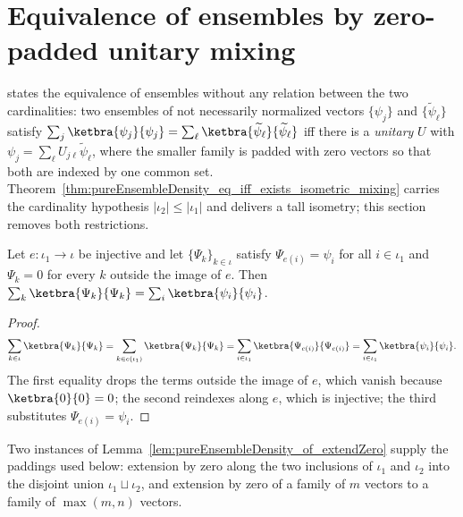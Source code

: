 \section{Equivalence of ensembles by zero-padded unitary mixing}
\label{sec:ensemble_equivalence_unitary}

\cite[Equivalence of ensembles, Equation~(2.10)]{Wolf2012Quantum} states the equivalence
of ensembles without any relation between the two cardinalities: two ensembles
of not necessarily normalized vectors $\{\psi_j\}$ and
$\{\widetilde\psi_\ell\}$ satisfy $\sum_j \ketbra{\psi_j}{\psi_j} = \sum_\ell
\ketbra{\widetilde\psi_\ell}{\widetilde\psi_\ell}$ iff there is a
\emph{unitary} $U$ with $\psi_j = \sum_\ell U_{j\ell}\widetilde\psi_\ell$,
where the smaller family is padded with zero vectors so that both are indexed
by one common set. Theorem~\ref{thm:pureEnsembleDensity_eq_iff_exists_isometric_mixing}
carries the cardinality hypothesis $|\iota_2| \le |\iota_1|$ and delivers a
tall isometry; this section removes both restrictions.

\begin{lemma}
    \label{lem:pureEnsembleDensity_of_extendZero}
    \leanok
    Let $e \colon \iota_1 \to \iota$ be injective and let
    $\{\Psi_k\}_{k \in \iota}$ satisfy $\Psi_{e(i)} = \psi_i$ for all
    $i \in \iota_1$ and $\Psi_k = 0$ for every $k$ outside the image of $e$.
    Then $\sum_{k} \ketbra{\Psi_k}{\Psi_k} = \sum_i \ketbra{\psi_i}{\psi_i}$.
\end{lemma}

\begin{proof}
    \leanok
    \begin{align}
        \sum_{k \in \iota} \ketbra{\Psi_k}{\Psi_k}
        = \sum_{k \in e(\iota_1)} \ketbra{\Psi_k}{\Psi_k}
        = \sum_{i \in \iota_1} \ketbra{\Psi_{e(i)}}{\Psi_{e(i)}}
        = \sum_{i \in \iota_1} \ketbra{\psi_i}{\psi_i}.
    \end{align}
    The first equality drops the terms outside the image of $e$, which vanish
    because $\ketbra{0}{0} = 0$; the second reindexes along $e$, which is
    injective; the third substitutes $\Psi_{e(i)} = \psi_i$.
\end{proof}

Two instances of Lemma~\ref{lem:pureEnsembleDensity_of_extendZero} supply the
paddings used below: extension by zero along the two inclusions of
$\iota_1$ and $\iota_2$ into the disjoint union $\iota_1 \sqcup \iota_2$, and
extension by zero of a family of $m$ vectors to a family of $\max(m,n)$
vectors.

